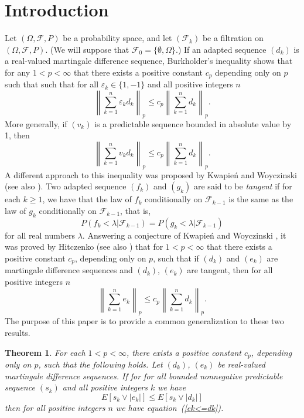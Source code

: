 \documentclass[12pt]{amsart}
\newtheorem{thm}{Theorem}
\begin{document}
\section{Introduction}
Let $(\Omega ,\mathcal{F},P)$ be a probability space, and let
$(\mathcal{F}_k)$ be a filtration on $(\Omega ,\mathcal{F},P)$. 
(We will suppose that $\mathcal{F}_0 = \{\emptyset,\Omega\}$.)
If an adapted sequence $(d_k)$
is a real-valued martingale difference sequence, Burkholder's
inequality \cite{B2} shows that for any $1<p<\infty$ that there exists
a positive constant $c_p$ depending
only on $p$ such that such that
for all $\varepsilon _k \in \{1,-1\}$ and all positive integers $n$
\[ \left\| \sum_{k=1}^n \varepsilon _k d_k \right\|_p 
\leq c_p \left\| \sum_{k=1}^n d_k \right\|_p .\]
More generally, if $(v_k)$ is a predictable sequence bounded
in absolute value by 1, then
\[ \left \| \sum_{k=1}^n v_k d_k \right\|_p 
\leq c_p \left\| \sum_{k=1}^n d_k \right\|_p .\]
A different approach to this inequality was proposed by
Kwapie\'n and Woyczinski \cite{KW1} (see also \cite{KW2}).
Two adapted sequence $(f_k)$ and $(g_k)$ are said to be \emph{tangent} if
for each $k\geq 1$, we have that the law of $f_k$ conditionally on
$ \mathcal{F}_{k-1} $ is the same as the law of $g_k$
conditionally on $\mathcal{F}_{k-1}$, that is,
\[P(f_k<\lambda | \mathcal{F}_{k-1})= P(g_k<\lambda | \mathcal{F}_{k-1})\]
for all real numbers $\lambda $. 
Answering a conjecture of Kwapie\'n and Woyczinski \cite{KW1},
it was proved by Hitczenko \cite{H1} (see also \cite{Z})
that for $1<p<\infty$ that there exists a positive constant $c_p$, 
depending only
on $p$, such that if $(d_k)$ and
$(e_k)$ are martingale difference sequences and $(d_k)$, $(e_k)$
are tangent, then for all positive integers $n$
\begin{equation}
\label{ek<=dk}
\left\|\sum_{k=1}^n e_k \right\|_p \leq c_p \left\| \sum_{k=1}^n
d_k \right\|_p.
\end{equation}
The purpose of this paper is to provide a common generalization to these
two results.

\begin{thm}
\label{t ek<=dk sk}
For each $1<p<\infty$, there exists a positive constant $c_p$, 
depending only on $p$, such
that the following holds.  
Let $(d_k)$, $(e_k)$ be real-valued martingale
difference sequences. If for for all bounded nonnegative predictable 
sequence $(s_k)$ and all positive integers $k$ we have
\begin{equation} 
\label{skek<=skdk}
E[s_k\vee |e_k|]\leq E[s_k \vee |d_k|]
\end{equation}
then for all positive integers $n$ we have
equation~(\ref{ek<=dk}).
\end{thm}
\end{document}
